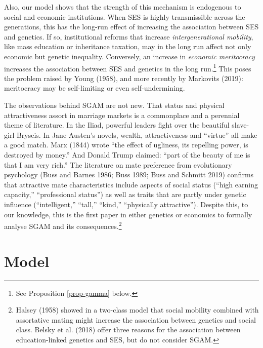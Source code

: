 \documentclass[
]{article}
\theoremstyle{definition}
\theoremstyle{definition}
\theoremstyle{definition}
\theoremstyle{definition}
\theoremstyle{remark}
\begin{document}
Also, our model shows that the strength of this mechanism is endogenous to
social and economic institutions. When SES is highly transmissible across the
generations, this has the long-run effect of increasing the association between
SES and genetics. If so, institutional reforms that increase \emph{intergenerational
mobility}, like mass education or inheritance taxation, may in the long run
affect not only economic but genetic inequality. Conversely, an increase in
\emph{economic meritocracy} increases the association between SES and genetics in the
long run.\footnote{See Proposition \ref{prop-gamma} below.} This poses the problem raised by Young (1958), and more
recently by Markovits (2019): meritocracy may be self-limiting or even
self-undermining.

The observations behind SGAM are not new. That status and physical
attractiveness assort in marriage markets is a commonplace and a perennial theme
of literature. In the Iliad, powerful leaders fight over the beautiful
slave-girl Bryseis. In Jane Austen's novels, wealth, attractiveness and ``virtue''
all make a good match. Marx (1844) wrote ``the effect of ugliness, its repelling
power, is destroyed by money.'' And Donald Trump claimed: ``part of the beauty of
me is that I am very rich.'' The literature on mate preference from evolutionary
psychology (Buss and Barnes 1986; Buss 1989; Buss and Schmitt 2019) confirms
that attractive mate characteristics include aspects of social status (``high
earning capacity,'' ``professional status'') as well as traits that are partly
under genetic influence (``intelligent,'' ``tall,'' ``kind,'' ``physically
attractive''). Despite this, to our knowledge, this is the first paper in either
genetics or economics to formally analyse SGAM and its consequences.\footnote{Halsey (1958) showed in a two-class model that social
  mobility combined with assortative mating might increase the association between
  genetics and social class. Belsky et al. (2018) offer three reasons for the
  association between education-linked genetics and SES, but do not consider SGAM.}

\hypertarget{model}{%
\section{Model}\label{model}}
\end{document}
